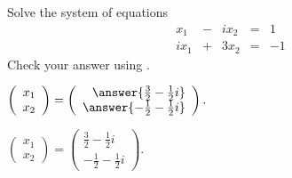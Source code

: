 \documentclass{ximera}
\begin{document}
\begin{exercise} \label{c2.5.1}
Solve the system of equations
\[
\begin{array}{rcrcr}
 x_1 & - & ix_2 & = &  1\\
ix_1 & + & 3x_2 & = & -1
\end{array}
\]
Check your answer using \Matlabp.
\begin{prompt}
  $\left(\begin{array}{c} x_1 \\ x_2\end{array}\right) =
\left(\begin{array}{r} \answer{\frac{3}{2} - \frac{1}{2}i} \\ \answer{-\frac{1}{2} - \frac{1}{2}i}\end{array}\right).$
\end{prompt}

\begin{solution}

$\left(\begin{array}{c} x_1 \\ x_2\end{array}\right) =
\left(\begin{array}{r} \frac{3}{2} - \frac{1}{2}i \\ -\frac{1}{2} -
\frac{1}{2}i\end{array}\right).$

\end{solution}
\end{exercise}
\end{document}
